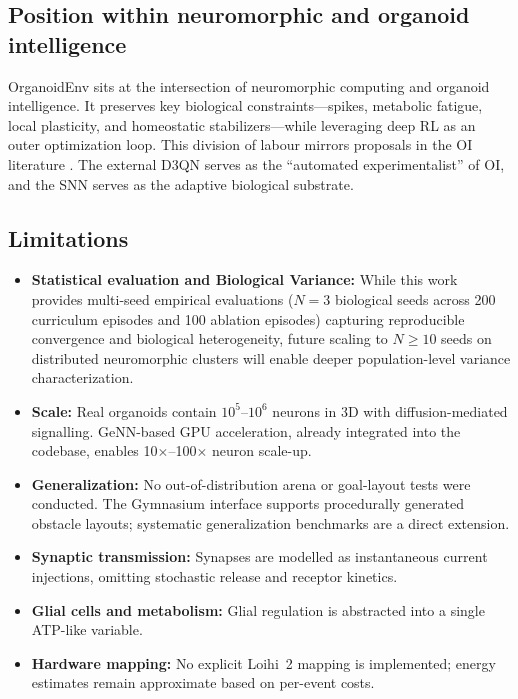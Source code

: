 \documentclass[journal,twocolumn]{IEEEtran}
\begin{document}
\subsection{Position within neuromorphic and organoid intelligence}

OrganoidEnv sits at the intersection of neuromorphic computing and
organoid intelligence.  It preserves key biological
constraints---spikes, metabolic fatigue, local plasticity, and
homeostatic stabilizers---while leveraging deep RL as an outer
optimization loop.  This division of labour mirrors proposals in the
OI literature \cite{Smirnova2023OI,Hartung2023OIworkshop,Xiong2024BridgingAI}.
The external D3QN serves as the ``automated experimentalist'' of OI,
and the SNN serves as the adaptive biological substrate.

\subsection{Limitations}

\begin{itemize}
\item \textbf{Statistical evaluation and Biological Variance:} While this work provides multi-seed empirical evaluations ($N=3$ biological seeds across 200 curriculum episodes and 100 ablation episodes) capturing reproducible convergence and biological heterogeneity, future scaling to $N \ge 10$ seeds on distributed neuromorphic clusters will enable deeper population-level variance characterization.
\item \textbf{Scale:} Real organoids contain $10^5$--$10^6$ neurons
      in 3D with diffusion-mediated signalling. GeNN-based GPU acceleration, 
      already integrated into the codebase, enables 10$\times$--100$\times$ neuron scale-up.
\item \textbf{Generalization:} No out-of-distribution arena or
      goal-layout tests were conducted. The Gymnasium interface supports 
      procedurally generated obstacle layouts; systematic generalization benchmarks 
      are a direct extension.
\item \textbf{Synaptic transmission:} Synapses are modelled as
      instantaneous current injections, omitting stochastic release
      and receptor kinetics.
\item \textbf{Glial cells and metabolism:} Glial regulation is
      abstracted into a single ATP-like variable.
\item \textbf{Hardware mapping:} No explicit Loihi~2 mapping is
      implemented; energy estimates remain approximate based on per-event costs.
\end{itemize}
\end{document}
